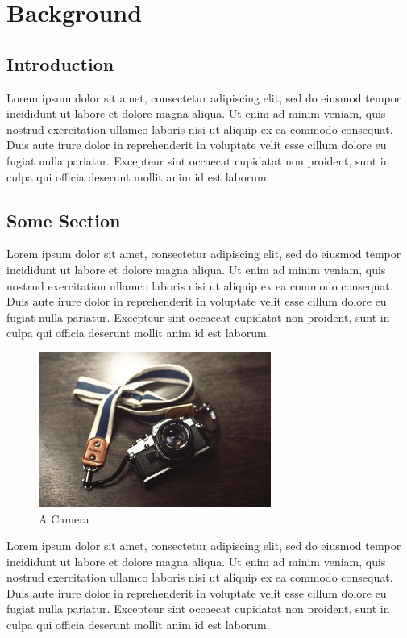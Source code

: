 \documentclass[document.tex]{subfiles}
\begin{document}
\chapter{Background}

\section{Introduction}
\noindent Lorem ipsum dolor sit amet, consectetur adipiscing elit, sed do eiusmod tempor incididunt ut labore et dolore magna aliqua. Ut enim ad minim veniam, quis nostrud exercitation ullamco laboris nisi ut aliquip ex ea commodo consequat. Duis aute irure dolor in reprehenderit in voluptate velit esse cillum dolore eu fugiat nulla pariatur. Excepteur sint occaecat cupidatat non proident, sunt in culpa qui officia deserunt mollit anim id est laborum.

\section{Some Section}
\noindent Lorem ipsum dolor sit amet, consectetur adipiscing elit, sed do eiusmod tempor incididunt ut labore et dolore magna aliqua. Ut enim ad minim veniam, quis nostrud exercitation ullamco laboris nisi ut aliquip ex ea commodo consequat. Duis aute irure dolor in reprehenderit in voluptate velit esse cillum dolore eu fugiat nulla pariatur. Excepteur sint occaecat cupidatat non proident, sunt in culpa qui officia deserunt mollit anim id est laborum.

\begin{figure}[H]
        \centering
        \includegraphics[width=3in]{imgs/camera.jpg}
        \caption[A Camera]
        {A Camera}
\end{figure}

\noindent Lorem ipsum dolor sit amet, consectetur adipiscing elit, sed do eiusmod tempor incididunt ut labore et dolore magna aliqua. Ut enim ad minim veniam, quis nostrud exercitation ullamco laboris nisi ut aliquip ex ea commodo consequat. Duis aute irure dolor in reprehenderit in voluptate velit esse cillum dolore eu fugiat nulla pariatur. Excepteur sint occaecat cupidatat non proident, sunt in culpa qui officia deserunt mollit anim id est laborum.
\end{document}
